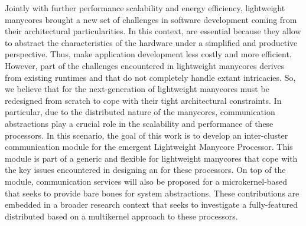 \begin{resumo}[english]

Jointly with further performance scalability and energy efficiency,
lightweight manycores brought a new set of challenges in software
development coming from their architectural particularities.
In this context, \oses are essential because they allow to abstract
the characteristics of the hardware under a simplified and productive
perspective.
Thus, \oses make application development less costly and more efficient.
However, part of the challenges encountered in lightweight manycores
derives from existing runtimes and \oses that do not completely handle
extant intricacies.
So, we believe that \oses for the next-generation of lightweight
manycores must be redesigned from scratch to cope with their
tight architectural constraints.
In particular, due to the distributed nature of the manycores,
communication abstractions play a crucial role in the scalability
and performance of these processors.
In this scenario, the goal of this work is to develop an inter-cluster
communication module for the emergent \mppa Lightweight Manycore Processor.
This module is part of a generic and flexible \hal for lightweight
manycores that cope with the key issues encountered in designing
an \os for these processors.
On top of the module, communication services will also be proposed
for a microkernel-based \os that seeks to provide bare bones for
system abstractions.
These contributions are embedded in a broader research context
that seeks to investigate a fully-featured distributed \os based
on a multikernel approach to these processors.

\end{resumo}